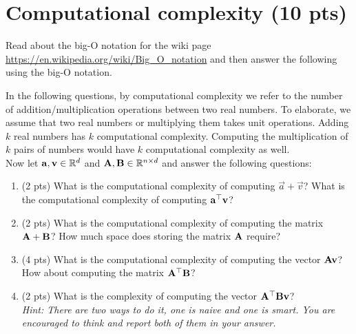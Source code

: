 \documentclass[11pt]{article}\usepackage[]{graphicx}\usepackage[]{color}
\begin{document}
\section{Computational complexity \small{(10 pts)}} %
\label{sec:computational_complexity}

Read about the big-O notation for the wiki page \url{https://en.wikipedia.org/wiki/Big_O_notation}
and then answer the following using the big-O notation.

  In the following questions, by computational complexity we refer
  to the number of addition/multiplication operations between two real numbers.
  To elaborate, we assume that two real numbers or multiplying them takes
  unit operations.
  Adding $k$ real numbers has $k$ computational complexity.
  Computing the multiplication of $k$ pairs of numbers would have $k$ 
  computational complexity as well.\\

  Now let $\mathbf{a}, \mathbf{v} \in \mathbb{R}^d$ and $\mathbf{A}, \mathbf{B} \in \mathbb{R}^{n
  \times
  d}$ and answer the following questions:
\begin{enumerate}
  \item (2 pts) What is the computational complexity of computing $\vec
  a + \vec
  v$? What is the computational complexity of computing $\mathbf{a} ^\top \mathbf{v}$?
  \item (2 pts) What is the computational complexity of computing the matrix
  $\mathbf{A} + \mathbf{B}$?  How much space does storing the matrix $\mathbf{A}$ require? 
  \item (4 pts) What is the computational complexity of computing the
  vector $\mathbf{A} \mathbf{v}$? How about computing the matrix $\mathbf{A} ^\top \mathbf{B}$?
  \item (2 pts) What is the complexity of computing the vector $\mathbf{A} ^\top
  \mathbf{B} \mathbf{v}$? \\
  {\emph{Hint: There are two ways to do it, one is naive and one is smart.
  You are encouraged to think and report both of them in your answer.}}
\end{enumerate}
\end{document}

